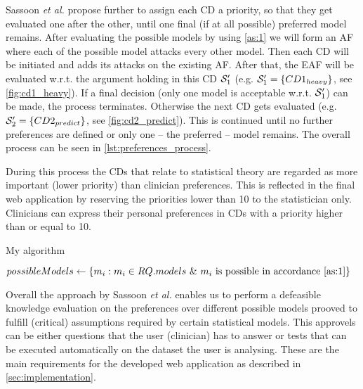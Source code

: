 Sassoon \textit{et al.} propose further to assign each \gls{CD} a priority, so that they get evaluated one after the other, until one final (if at all possible) preferred model remains. After evaluating the possible models by using \autoref{as:1} we will form an \gls{AF} where each of the possible model attacks every other model. Then each \gls{CD} will be initiated and adds its attacks on the existing \gls{AF}. After that, the \gls{EAF} will be evaluated w.r.t. the argument holding in this \gls{CD} $\S_1'$ (e.g. $\S_1' = \{CD1_{heavy}\}$, see \autoref{fig:cd1_heavy}). If a final decision (only one model is acceptable w.r.t. $\S_1'$) can be made, the process terminates. Otherwise the next \gls{CD} gets evaluated (e.g. $\S_2' = \{CD2_{predict}\}$, see \autoref{fig:cd2_predict}). This is continued until no further preferences are defined or only one -- the preferred -- model remains. The overall process can be seen in \autoref{lst:preferences_process}.

During this process the \glspl{CD} that relate to statistical theory are regarded as more important (lower priority) than clinician preferences. This is reflected in the final web application by reserving the priorities lower than 10 to the statistician only. Clinicians can express their personal preferences in \glspl{CD} with a priority higher than or equal to 10. 
 
\begin{algorithm}[h]
\caption{My algorithm}\label{lst:preferences_process}
\begin{algorithmic}[1]
\State $possibleModels \gets \{m_i : m_i \in RQ.models~\&~ m_i\text{ is possible in accordance \autoref{as:1}} \}$
\end{algorithmic}
\end{algorithm}

Overall the approach by Sassoon \textit{et al.} enables us to perform a defeasible knowledge evaluation on the preferences over different possible models prooved to fulfill (critical) assumptions required by certain statistical models. This approvels can be either questions that the user (clinician) has to answer or tests that can be executed automatically on the dataset the user is analysing. 
These are the main requirements for the developed web application as described in \autoref{sec:implementation}.
